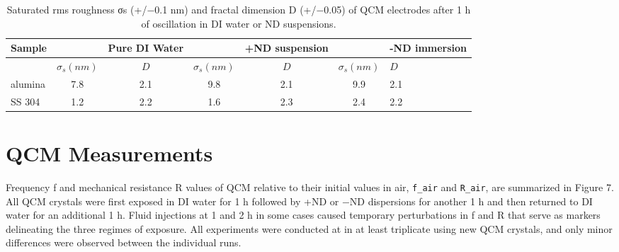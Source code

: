 \begin{table}
	\caption{Saturated rms roughness σs (+/−0.1 nm) and fractal dimension D (+/−0.05) of QCM electrodes after 1 h of oscillation in DI water or ND suspensions.}
	\label{table-two}
	\begin{center}
		\begin{tabular}{lcccccl}
			\toprule
			Sample && Pure DI Water & & +ND suspension & & -ND immersion\\
			
			\midrule
			& $\sigma_{s} (nm)$ &$\mathit{D}$   &$\sigma_{s} (nm)$  & $\mathit{D}$   &  $\sigma_{s} (nm)$ &$\mathit{D}$ \\
			\midrule
			alumina &7.8 & 2.1 & 9.8 & 2.1 & 9.9 & 2.1\\
			SS 304 	&1.2 &2.2 & 1.6 & 2.3 & 2.4 & 2.2 \\
			
			\bottomrule
		\end{tabular}
	\end{center}
\end{table}


\section{QCM Measurements}

Frequency f and mechanical resistance R values of QCM relative to their initial values in air, \verb|f_air| and \verb|R_air|, are summarized in Figure 7. All QCM crystals were first exposed in DI water for 1 h followed by +ND or −ND dispersions for another 1 h and then returned to DI water for an additional 1 h. Fluid injections at 1 and 2 h in some cases caused temporary perturbations in f and R that serve as markers delineating the three regimes of exposure. All experiments were conducted at in at least triplicate using new QCM crystals, and only minor differences were observed between the individual runs.

